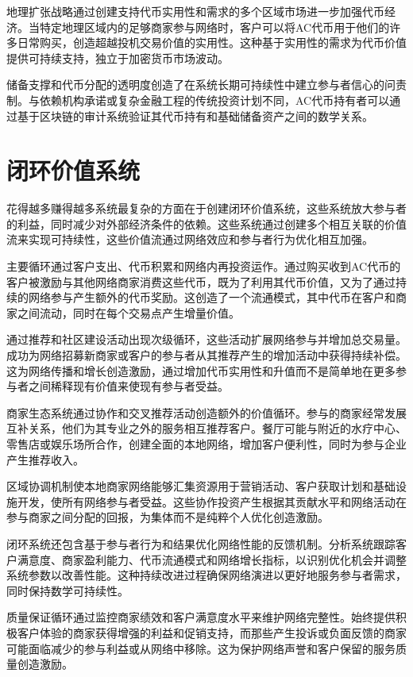 \documentclass[
  Letterpaper,
]{scrbook}
\begin{document}
地理扩张战略通过创建支持代币实用性和需求的多个区域市场进一步加强代币经济。当特定地理区域内的足够商家参与网络时，客户可以将AC代币用于他们的许多日常购买，创造超越投机交易价值的实用性。这种基于实用性的需求为代币价值提供可持续支持，独立于加密货币市场波动。

储备支撑和代币分配的透明度创造了在系统长期可持续性中建立参与者信心的问责制。与依赖机构承诺或复杂金融工程的传统投资计划不同，AC代币持有者可以通过基于区块链的审计系统验证其代币持有和基础储备资产之间的数学关系。

\section{闭环价值系统}\label{ux95edux73afux4ef7ux503cux7cfbux7edf}

花得越多赚得越多系统最复杂的方面在于创建闭环价值系统，这些系统放大参与者的利益，同时减少对外部经济条件的依赖。这些系统通过创建多个相互关联的价值流来实现可持续性，这些价值流通过网络效应和参与者行为优化相互加强。

主要循环通过客户支出、代币积累和网络内再投资运作。通过购买收到AC代币的客户被激励与其他网络商家消费这些代币，既为了利用其代币价值，又为了通过持续的网络参与产生额外的代币奖励。这创造了一个流通模式，其中代币在客户和商家之间流动，同时在每个交易点产生增量价值。

通过推荐和社区建设活动出现次级循环，这些活动扩展网络参与并增加总交易量。成功为网络招募新商家或客户的参与者从其推荐产生的增加活动中获得持续补偿。这为网络传播和增长创造激励，通过增加代币实用性和升值而不是简单地在更多参与者之间稀释现有价值来使现有参与者受益。

商家生态系统通过协作和交叉推荐活动创造额外的价值循环。参与的商家经常发展互补关系，他们为其专业之外的服务相互推荐客户。餐厅可能与附近的水疗中心、零售店或娱乐场所合作，创建全面的本地网络，增加客户便利性，同时为参与企业产生推荐收入。

区域协调机制使本地商家网络能够汇集资源用于营销活动、客户获取计划和基础设施开发，使所有网络参与者受益。这些协作投资产生根据其贡献水平和网络活动在参与商家之间分配的回报，为集体而不是纯粹个人优化创造激励。

闭环系统还包含基于参与者行为和结果优化网络性能的反馈机制。分析系统跟踪客户满意度、商家盈利能力、代币流通模式和网络增长指标，以识别优化机会并调整系统参数以改善性能。这种持续改进过程确保网络演进以更好地服务参与者需求，同时保持数学可持续性。

质量保证循环通过监控商家绩效和客户满意度水平来维护网络完整性。始终提供积极客户体验的商家获得增强的利益和促销支持，而那些产生投诉或负面反馈的商家可能面临减少的参与利益或从网络中移除。这为保护网络声誉和客户保留的服务质量创造激励。
\end{document}
